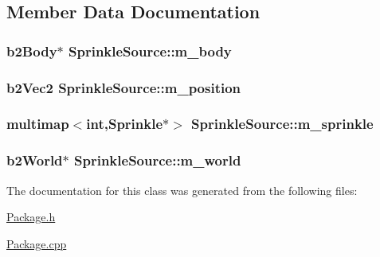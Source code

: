 \subsection{Member Data Documentation}
\hypertarget{classSprinkleSource_a6aabdc2149d75deb8fd91c4204605a6e}{
\subsubsection[{m\-\_\-body}]{\setlength{\rightskip}{0pt plus 5cm}b2\-Body$\ast$ Sprinkle\-Source\-::m\-\_\-body}}\label{classSprinkleSource_a6aabdc2149d75deb8fd91c4204605a6e}
\hypertarget{classSprinkleSource_a4fe9f165895202faf9be6c3b0c3c9e1e}{
\subsubsection[{m\-\_\-position}]{\setlength{\rightskip}{0pt plus 5cm}b2\-Vec2 Sprinkle\-Source\-::m\-\_\-position}}\label{classSprinkleSource_a4fe9f165895202faf9be6c3b0c3c9e1e}
\hypertarget{classSprinkleSource_a666b3620ce503c263a05a05da02b7f07}{
\subsubsection[{m\-\_\-sprinkle}]{\setlength{\rightskip}{0pt plus 5cm}multimap$<$int,{\bf Sprinkle}$\ast$$>$ Sprinkle\-Source\-::m\-\_\-sprinkle}}\label{classSprinkleSource_a666b3620ce503c263a05a05da02b7f07}
\hypertarget{classSprinkleSource_a364f280e34168ed14147ee7ad9ce8436}{
\subsubsection[{m\-\_\-world}]{\setlength{\rightskip}{0pt plus 5cm}b2\-World$\ast$ Sprinkle\-Source\-::m\-\_\-world}}\label{classSprinkleSource_a364f280e34168ed14147ee7ad9ce8436}


The documentation for this class was generated from the following files\-:\begin{DoxyCompactItemize}
\item 
\hyperlink{Package_8h}{Package.\-h}\item 
\hyperlink{Package_8cpp}{Package.\-cpp}\end{DoxyCompactItemize}
